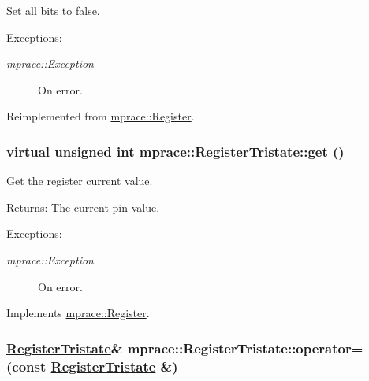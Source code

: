 Set all bits to false. 

\begin{Desc}
\item[Exceptions:]
\begin{description}
\item[{\em mprace::Exception}]On error.\end{description}
\end{Desc}


Reimplemented from \hyperlink{classmprace_1_1Register_a4}{mprace::Register}.\hypertarget{classmprace_1_1RegisterTristate_a5}{
\subsubsection[get]{\setlength{\rightskip}{0pt plus 5cm}virtual unsigned int mprace::Register\-Tristate::get ()}}
\label{classmprace_1_1RegisterTristate_a5}


Get the register current value. 

\begin{Desc}
\item[Returns:]The current pin value. \end{Desc}
\begin{Desc}
\item[Exceptions:]
\begin{description}
\item[{\em mprace::Exception}]On error.\end{description}
\end{Desc}


Implements \hyperlink{classmprace_1_1Register_a2}{mprace::Register}.\hypertarget{classmprace_1_1RegisterTristate_b1}{
\subsubsection[operator=]{\setlength{\rightskip}{0pt plus 5cm}\hyperlink{classmprace_1_1RegisterTristate}{Register\-Tristate}\& mprace::Register\-Tristate::operator= (const \hyperlink{classmprace_1_1RegisterTristate}{Register\-Tristate} \&)}}
\label{classmprace_1_1RegisterTristate_b1}


